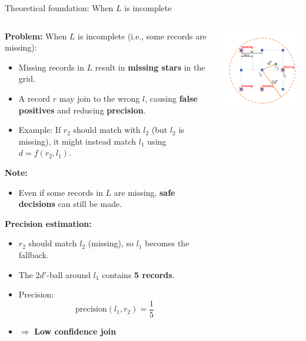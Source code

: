 \documentclass[8pt]{beamer} %
\begin{document}
\begin{frame}{Theoretical foundation: When $L$ is incomplete}
	\begin{columns}
		\begin{column}{0.53\textwidth}
			\textbf{Problem:} When $L$ is incomplete (i.e., some records are missing):
			\begin{itemize}
				\item Missing records in $L$ result in \textbf{missing stars} in the grid.
				\item A record $r$ may join to the wrong $l$, causing \textbf{false positives} and reducing \textbf{precision}.
				\item Example: If $r_2$ should match with $l_2$ (but $l_2$ is missing), it might instead match $l_1$ using $d = f(r_2, l_1)$.
			\end{itemize}
			

			\textbf{Note:}
			\begin{itemize}
				\item Even if some records in $L$ are missing, \textbf{safe decisions} can still be made.
			\end{itemize}
			

			\textbf{Precision estimation:}
			\begin{itemize}
				\item $r_2$ should match $l_2$ (missing), so $l_1$ becomes the fallback.
				\item The 2$d'$-ball around $l_1$ contains \textbf{5 records}.
				\item Precision:
				$$
				\text{precision}(l_1, r_2) = \frac{1}{5}
				$$
				\item $\Rightarrow$ \textbf{Low confidence join}
			\end{itemize}
		\end{column}
		
		\begin{column}{0.43\textwidth}
			\centering
			\includegraphics[width=0.7\linewidth]{img/Pasted image 20250331211607.png}
		

\end{column}
\end{columns}
\end{frame}
\end{document}
